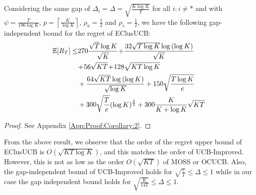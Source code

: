 \begin{corollary}
\label{Result:Corollary:2}
Considering the same gap of $\Delta_{i} = \Delta =\sqrt{\frac{K\log K}{T}}$ for all ${i:i\neq *}$ and with $\psi=\frac{T}{196 \log K}$, $p=\left\lceil\frac{K}{\log K}\right\rceil$, $\rho_{a}=\frac{1}{2}$ and $\rho_{s}=\frac{1}{2}$, 
 we have the following gap-independent bound for the regret of EClusUCB:
\begin{align*}
 \mathbb{E}[R_{T}]\le & 270\frac{\sqrt{T}\log K}{\sqrt{K}} \!+\! \frac{32\sqrt{T\log K}\log{(\log K)}}{\sqrt{K}}\\
  &\!+\! 56\sqrt{KT} \!+\! 128\sqrt{KT\log K}\\
	& + \frac{64\sqrt{KT}\log{(\log K)}}{\sqrt{\log K}} + 150\sqrt{\frac{T\log K}{e}}\\
	& + 300\sqrt{\frac{T}{e}}(\log K)^{\frac{3}{2}} + 300 \frac{K}{K+\log K}\sqrt{KT}
\end{align*}
\end{corollary}
\begin{proof}
 See Appendix \ref{App:Proof:Corollary:2}.
\end{proof}


From the above result, we observe that the order of the regret upper bound of EClusUCB is $O(\sqrt{KT\log K})$, and this matches the order of UCB-Improved. However, this is not as low as the order $O(\sqrt{KT})$ of MOSS or OCUCB. Also, the gap-independent bound of UCB-Improved holds for $ \sqrt{\frac{e}{T}} \leq \Delta \leq 1$ while in our case the gap independent bound holds for $\sqrt{\frac{K}{14T}} \leq \Delta \leq 1$.

